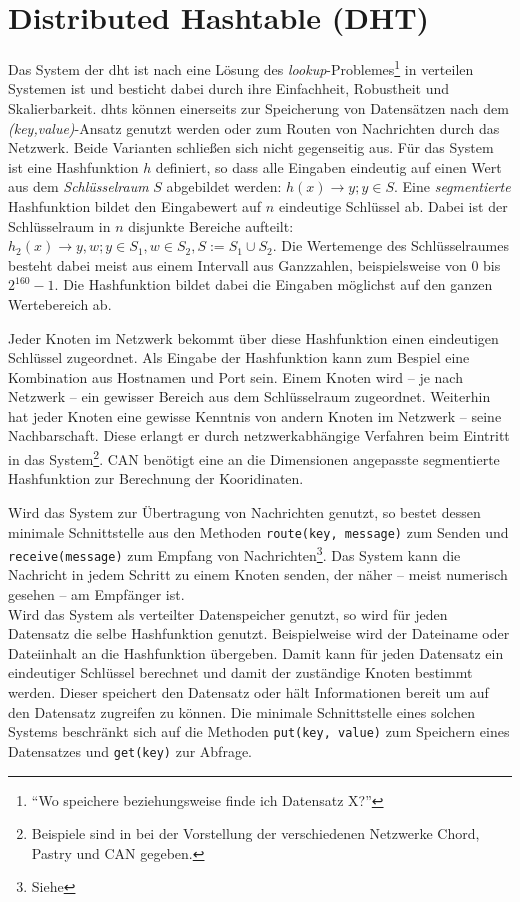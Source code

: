 \chapter{Distributed Hashtable (DHT)}
\label{chap:dht}

Das System der \acf{dht} ist nach \cite{Wehrle2005} eine Lösung des \emph{lookup}-Problemes\footnote{``Wo speichere beziehungsweise finde ich Datensatz X?''} in verteilen Systemen ist und besticht dabei durch ihre Einfachheit, Robustheit und Skalierbarkeit. \acp{dht} können einerseits zur Speicherung von Datensätzen nach dem \emph{(key,value)}-Ansatz genutzt werden oder zum Routen von Nachrichten durch das Netzwerk. Beide Varianten schließen sich nicht gegenseitig aus. Für das System ist eine Hashfunktion $h$ definiert, so dass alle Eingaben eindeutig auf einen Wert aus dem \emph{Schlüsselraum} $S$ abgebildet werden: $h(x) \rightarrow y; y \in S$. Eine \emph{segmentierte} Hashfunktion bildet den Eingabewert auf $n$ eindeutige Schlüssel ab. Dabei ist der Schlüsselraum in $n$ disjunkte Bereiche aufteilt: $h_2(x) \rightarrow y,w; y \in S_1, w \in S_2, S := S_1 \cup S_2$. Die Wertemenge des Schlüsselraumes besteht dabei meist aus einem Intervall aus Ganzzahlen, beispielsweise von $0$ bis $2^{160}-1$. Die Hashfunktion bildet dabei die Eingaben möglichst auf den ganzen Wertebereich ab.

Jeder Knoten im Netzwerk bekommt über diese Hashfunktion einen eindeutigen Schlüssel zugeordnet. Als Eingabe der Hashfunktion kann zum Bespiel eine Kombination aus Hostnamen und Port sein. Einem Knoten wird -- je nach Netzwerk -- ein gewisser Bereich aus dem Schlüsselraum zugeordnet. Weiterhin hat jeder Knoten eine gewisse Kenntnis von andern Knoten im Netzwerk -- seine Nachbarschaft. Diese erlangt er durch netzwerkabhängige Verfahren beim Eintritt in das System\footnote{Beispiele sind in  bei der Vorstellung der verschiedenen Netzwerke Chord, Pastry und CAN gegeben.}. CAN benötigt eine an die Dimensionen angepasste segmentierte Hashfunktion zur Berechnung der Kooridinaten.

Wird das System zur Übertragung von Nachrichten genutzt, so bestet dessen minimale Schnittstelle aus den Methoden \texttt{route(key, message)} zum Senden und \texttt{receive(message)} zum Empfang von Nachrichten\footnote{Siehe }. Das System kann die Nachricht in jedem Schritt zu einem Knoten senden, der näher -- meist numerisch gesehen -- am Empfänger ist.\\
Wird das System als verteilter Datenspeicher genutzt, so wird für jeden Datensatz die selbe Hashfunktion genutzt. Beispielweise wird der Dateiname oder Dateiinhalt an die Hashfunktion übergeben. Damit kann für jeden Datensatz ein eindeutiger Schlüssel berechnet und damit der zuständige Knoten bestimmt werden. Dieser speichert den Datensatz oder hält Informationen bereit um auf den Datensatz zugreifen zu können. Die minimale Schnittstelle eines solchen Systems beschränkt sich auf die Methoden \texttt{put(key, value)} zum Speichern eines Datensatzes und \texttt{get(key)} zur Abfrage.

